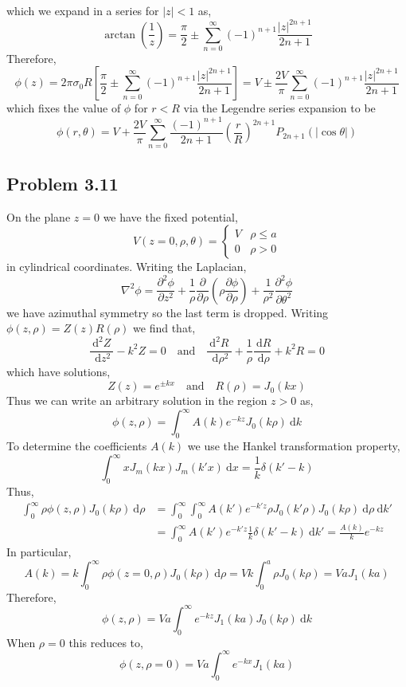\documentclass[12pt]{extarticle}
\renewcommand{\d}[1]{\: \mathrm{d}#1}
\newcommand{\dn}[2]{\: \mathrm{d}^{#1} #2 \:}
\newcommand{\deriv}[2]{\frac{\d{#1}}{\d{#2}}}
\newcommand{\nderiv}[3]{\frac{\dn{#1}{#2}}{\d{#3^{#1}}}}
\newcommand{\pderiv}[2]{\frac{\partial{#1}}{\partial{#2}}}
\newcommand{\parsq}[2]{\frac{\partial^2{#1}}{\partial{#2}^2}}
\theoremstyle{definition}
\begin{document}
which we expand in a series for $|z| < 1$ as,
\[ \arctan{\left(\frac{1}{z}\right)} = \frac{\pi}{2} \pm \sum_{n = 0}^\infty (-1)^{n + 1} \frac{|z|^{2n+1}}{2 n + 1} \]
Therefore,
\[ \phi(z) = 2 \pi \sigma_0 R \left[ \frac{\pi}{2} \pm \sum_{n = 0}^\infty (-1)^{n + 1} \frac{|z|^{2n+1}}{2 n + 1} \right] = V \pm \frac{2 V}{\pi} \sum_{n = 0}^\infty (-1)^{n + 1} \frac{|z|^{2n+1}}{2 n + 1} \]
which fixes the value of $\phi$ for $r < R$ via the Legendre series expansion to be
\[ \phi(r, \theta) = V + \frac{2 V}{\pi} \sum_{n = 0}^\infty \frac{(-1)^{n+1}}{2 n + 1} \left( \frac{r}{R} \right)^{2n + 1} P_{2n+1}(|\cos{\theta}|) \]

\subsection{Problem 3.11}

On the plane $z = 0$ we have the fixed potential,
\[ V(z = 0, \rho, \theta) = 
\begin{cases}
V & \rho \le a 
\\
0 & \rho > 0
\end{cases}\]
in cylindrical coordinates.
Writing the Laplacian,
\[ \nabla^2 \phi = \parsq{\phi}{z} + \frac{1}{\rho} \pderiv{}{\rho} \left( \rho \pderiv{\phi}{\rho} \right) + \frac{1}{\rho^2} \parsq{\phi}{\theta} \]
we have azimuthal symmetry so the last term is dropped. Writing $\phi(z, \rho) = Z(z) R(\rho)$ we find that,
\[ \nderiv{2}{Z}{z} - k^2 Z = 0 \quad \text{and} \quad \nderiv{2}{R}{\rho} + \frac{1}{\rho} \deriv{R}{\rho} + k^2 R = 0  \]
which have solutions,
\[ Z(z) = e^{\pm k x} \quad \text{and} \quad R(\rho) = J_0(k x) \]
Thus we can write an arbitrary solution in the region $z > 0$ as,
\[ \phi(z, \rho) = \int_{0}^\infty A(k) e^{-kz} J_0(k \rho) \d{k} \]
To determine the coefficients $A(k)$ we use the Hankel transformation property,
\[ \int_0^\infty x J_m(kx) J_m(k'x) \d{x} = \frac{1}{k} \delta(k' - k) \]
Thus,
\begin{align*}
\int_0^\infty \rho \phi(z, \rho) J_0(k \rho) \d{\rho} & = \int_{0}^\infty \int_0^\infty A(k') e^{-k'z} \rho J_0(k' \rho) J_0(k \rho) \d{\rho} \d{k'}
\\
& = \int_{0}^\infty A(k') e^{-k'z} \frac{1}{k} \delta(k' - k)  \d{k'} = \frac{A(k)}{k} e^{-k z} 
\end{align*}
In particular,
\[ A(k) = k \int_0^\infty \rho \phi(z = 0, \rho) J_0(k \rho) \d{\rho} = V k \int_0^a \rho J_0(k \rho) = V a J_1(k a)  \]
Therefore,
\[ \phi(z, \rho) = Va \int_0^\infty e^{-kz} J_1(k a) J_0(k \rho) \d{k} \]
When $\rho = 0$ this reduces to,
\[ \phi(z, \rho = 0) = Va \int_0^\infty e^{-kx} J_1(k a) \]
\end{document}
